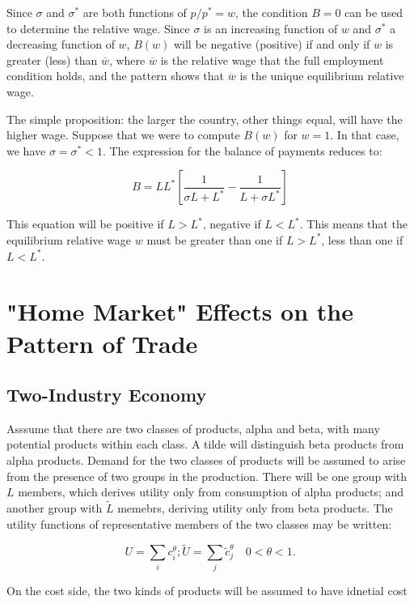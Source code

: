 Since $\sigma$ and $\sigma^*$ are both functions of $p/p^* = w$, the condition $B = 0$ can be used to determine the relative wage. Since $\sigma$ is an increasing function of $w$ and $\sigma^*$ a decreasing function of $w$, $B(w)$ will be negative (positive) if and only if $w$ is greater (less) than $\overline{w}$, where $\overline{w}$ is the relative wage that the full employment condition holds, and the pattern shows that $\overline{w}$ is the unique equilibrium relative wage.

The simple proposition: the larger the country, other things equal, will have the higher wage. Suppose that we were to compute $B(w)$ for $w = 1$. In that case, we have $\sigma = \sigma^* < 1$. The expression for the balance of payments reduces to:

\begin{equation}
  B = LL^* [ \frac{1}{\sigma L + L^*} - \frac{1}{L + \sigma L^*}]
\end{equation}

This equation will be positive if $L > L^*$, negative if $L < L^*$. This means that the equilibrium relative wage $w$ must be greater than one if $L > L^*$, less than one if $L < L^*$.

\section{"Home Market" Effects on the Pattern of Trade}

\subsection{Two-Industry Economy}

Asssume that there are two classes of products, alpha and beta, with many potential products within each class. A tilde will distinguish beta products from alpha products. Demand for the two classes of products will be assumed to arise from the presence of two groups in the production. There will be one group with $L$ members, which derives utility only from consumption of alpha products; and another group with $\tilde{L}$ memebrs, deriving utility only from beta products. The utility functions of representative members of the two classes may be written:

\begin{equation}
  U = \sum_i c_i^{\theta}; \tilde{U} = \sum_j \tilde{c}_j^{\theta} \quad 0 < \theta < 1.
\end{equation}

On the cost side, the two kinds of products will be assumed to have idnetial cost

